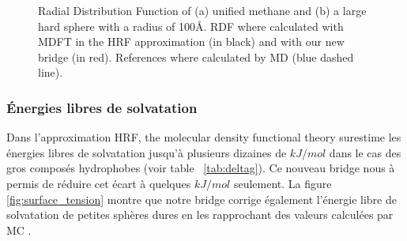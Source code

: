 \begin{figure}
\centering

\begin{subfigure}{.5\textwidth}
  \centering
\end{subfigure}


\begin{subfigure}{.5\textwidth}
  \centering
\end{subfigure}
    \caption{ Radial Distribution Function of (a) unified methane and (b) a large hard sphere with a radius of 100$\text{\AA}$. RDF where calculated with MDFT in the HRF approximation (in black) and with our new bridge (in red). References where calculated by MD (blue dashed line). }
    \label{fig:g_of_r}
\end{figure}



\subsubsection{\'Energies libres de solvatation}
Dans l'approximation HRF, the molecular density functional theory surestime les énergies libres de solvatation jusqu'à plusieurs dizaines de $kJ/mol$ dans le cas des gros composés hydrophobes (voir table ~\ref{tab:deltag}). Ce nouveau bridge nous à permis de réduire cet écart à quelques $kJ/mol$ seulement. La figure \ref{fig:surface_tension} montre que notre bridge corrige également l'énergie libre de solvatation de petites sphères dures en les rapprochant des valeurs calculées par MC \cite{hummer_information_1996}.


